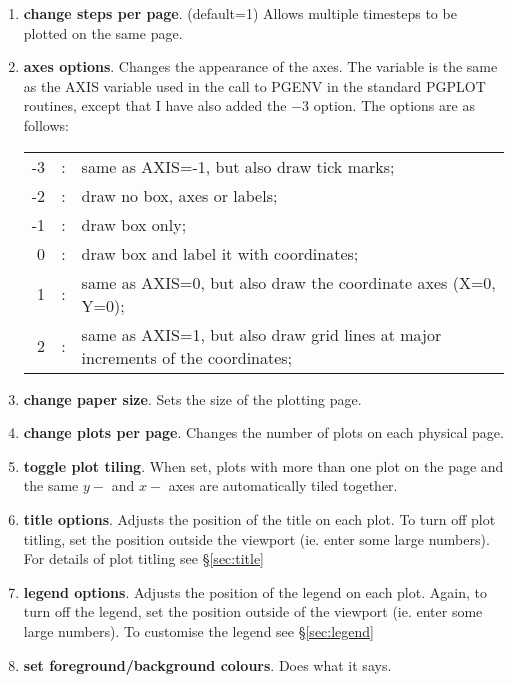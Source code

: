 \documentclass[a4paper,11pt]{article}
\begin{document}
\begin{enumerate}
\item \textbf{change steps per page}. (default=1) Allows multiple timesteps to be plotted on
the same page.
\item \textbf{axes options}. Changes the appearance of the axes. The variable is
the same as the AXIS variable used in the call to PGENV in the standard PGPLOT
routines, except that I have also added the $-3$ option. The options are
as follows:

\begin{tabular}{rcp{}}
-3 & : & same as AXIS=-1, but also draw tick marks; \\
 -2 & : & draw no box, axes or labels; \\
 -1 & : & draw box only; \\
  0 & : & draw box and label it with coordinates; \\
  1 & : & same as AXIS=0, but also draw the coordinate axes (X=0, Y=0); \\
  2 & : & same as AXIS=1, but also draw grid lines at major increments of the coordinates;
\end{tabular}

\item \textbf{change paper size}. Sets the size of the plotting page.
\item \textbf{change plots per page}. Changes the number of plots on each
physical page.
\item \textbf{toggle plot tiling}. When set, plots with more than one plot on
the page and the same $y-$ and $x-$ axes are automatically tiled together.
\item \textbf{title options}. Adjusts the position of the title on
each plot. To turn off plot titling, set the position outside the viewport (ie.
enter some large numbers). For details of plot titling see \S\vref{sec:title}
\item \textbf{legend options}. Adjusts the position of the legend on
each plot. Again, to turn off the legend, set the position outside of the
viewport (ie. enter some large numbers). To customise the legend see
\S\vref{sec:legend}
\item \textbf{set foreground/background colours}. Does what it says.
\end{enumerate}
\end{document}

